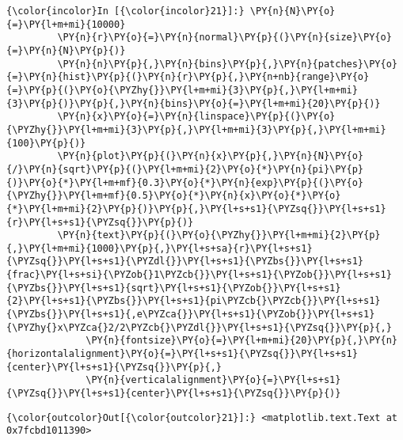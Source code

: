     \begin{Verbatim}[commandchars=\\\{\}]
{\color{incolor}In [{\color{incolor}21}]:} \PY{n}{N}\PY{o}{=}\PY{l+m+mi}{10000}
         \PY{n}{r}\PY{o}{=}\PY{n}{normal}\PY{p}{(}\PY{n}{size}\PY{o}{=}\PY{n}{N}\PY{p}{)}
         \PY{n}{n}\PY{p}{,}\PY{n}{bins}\PY{p}{,}\PY{n}{patches}\PY{o}{=}\PY{n}{hist}\PY{p}{(}\PY{n}{r}\PY{p}{,}\PY{n+nb}{range}\PY{o}{=}\PY{p}{(}\PY{o}{\PYZhy{}}\PY{l+m+mi}{3}\PY{p}{,}\PY{l+m+mi}{3}\PY{p}{)}\PY{p}{,}\PY{n}{bins}\PY{o}{=}\PY{l+m+mi}{20}\PY{p}{)}
         \PY{n}{x}\PY{o}{=}\PY{n}{linspace}\PY{p}{(}\PY{o}{\PYZhy{}}\PY{l+m+mi}{3}\PY{p}{,}\PY{l+m+mi}{3}\PY{p}{,}\PY{l+m+mi}{100}\PY{p}{)}
         \PY{n}{plot}\PY{p}{(}\PY{n}{x}\PY{p}{,}\PY{n}{N}\PY{o}{/}\PY{n}{sqrt}\PY{p}{(}\PY{l+m+mi}{2}\PY{o}{*}\PY{n}{pi}\PY{p}{)}\PY{o}{*}\PY{l+m+mf}{0.3}\PY{o}{*}\PY{n}{exp}\PY{p}{(}\PY{o}{\PYZhy{}}\PY{l+m+mf}{0.5}\PY{o}{*}\PY{n}{x}\PY{o}{*}\PY{o}{*}\PY{l+m+mi}{2}\PY{p}{)}\PY{p}{,}\PY{l+s+s1}{\PYZsq{}}\PY{l+s+s1}{r}\PY{l+s+s1}{\PYZsq{}}\PY{p}{)}
         \PY{n}{text}\PY{p}{(}\PY{o}{\PYZhy{}}\PY{l+m+mi}{2}\PY{p}{,}\PY{l+m+mi}{1000}\PY{p}{,}\PY{l+s+sa}{r}\PY{l+s+s1}{\PYZsq{}}\PY{l+s+s1}{\PYZdl{}}\PY{l+s+s1}{\PYZbs{}}\PY{l+s+s1}{frac}\PY{l+s+si}{\PYZob{}1\PYZcb{}}\PY{l+s+s1}{\PYZob{}}\PY{l+s+s1}{\PYZbs{}}\PY{l+s+s1}{sqrt}\PY{l+s+s1}{\PYZob{}}\PY{l+s+s1}{2}\PY{l+s+s1}{\PYZbs{}}\PY{l+s+s1}{pi\PYZcb{}\PYZcb{}}\PY{l+s+s1}{\PYZbs{}}\PY{l+s+s1}{,e\PYZca{}}\PY{l+s+s1}{\PYZob{}}\PY{l+s+s1}{\PYZhy{}x\PYZca{}2/2\PYZcb{}\PYZdl{}}\PY{l+s+s1}{\PYZsq{}}\PY{p}{,}
              \PY{n}{fontsize}\PY{o}{=}\PY{l+m+mi}{20}\PY{p}{,}\PY{n}{horizontalalignment}\PY{o}{=}\PY{l+s+s1}{\PYZsq{}}\PY{l+s+s1}{center}\PY{l+s+s1}{\PYZsq{}}\PY{p}{,}
              \PY{n}{verticalalignment}\PY{o}{=}\PY{l+s+s1}{\PYZsq{}}\PY{l+s+s1}{center}\PY{l+s+s1}{\PYZsq{}}\PY{p}{)}
\end{Verbatim}

            \begin{Verbatim}[commandchars=\\\{\}]
{\color{outcolor}Out[{\color{outcolor}21}]:} <matplotlib.text.Text at 0x7fcbd1011390>
\end{Verbatim}
        
    \begin{center}
    \end{center}
    { \hspace*{\fill} \\}
    

